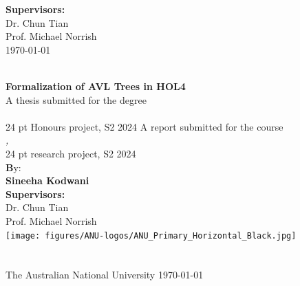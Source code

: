 \noindent
{\footnotesize \bfseries Supervisors:}\\
{\footnotesize Dr. Chun Tian\\
Prof. Michael Norrish}\\[2 em]
\vfill
{\footnotesize \monthyeardate\today}

\else %

\begin{center}
\ \\[1em]
{\bfseries \Huge Formalization of AVL Trees in HOL4}\\[4em]
%
\ifHonoursThesis%
\Large{A thesis submitted for the degree}\\
\Large{\emph{\Degree}}\\[.5em]
{24 pt Honours project, S2 2024}
\else%
\Large{A report submitted for the course}\\
\Large{\emph{\CourseCode, \CourseName}}\\[.5em]
{24 pt research project, S2 2024}
\fi
%
\ \\[4em]
{\footnotesize \textbf By:}\\
\textbf{Sineeha Kodwani}\\[3em]
%
{\bfseries Supervisors:}\\
Dr. Chun Tian\\
Prof. Michael Norrish\\[6em]
%
\texttt{[image: figures/ANU-logos/ANU\_Primary\_Horizontal\_Black.jpg]}\ \\[3em]
%
{\bfseries \School}\\
{\mdseries \College}\\
The Australian National University
%
\vfill
\normalsize{\monthyeardate\today}
\end{center}

\fi

\restoregeometry
\newpage